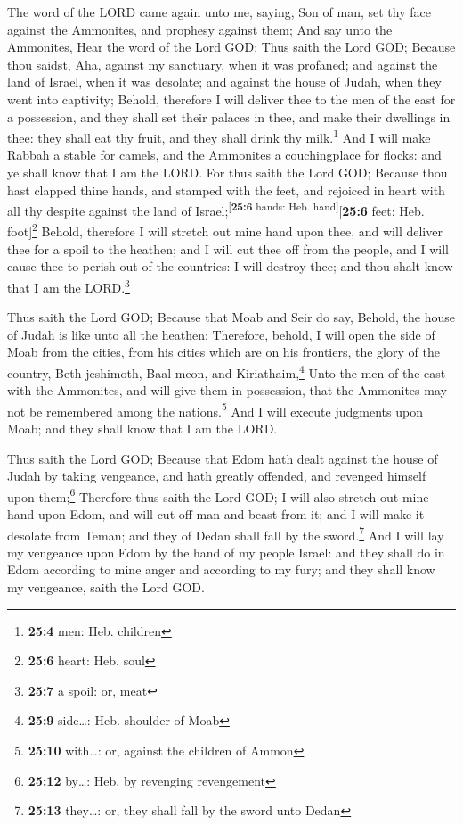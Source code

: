  The word of the LORD came again unto me, saying,
 Son of man, set thy face against the Ammonites, and
prophesy against them;  And say unto the Ammonites, Hear
the word of the Lord GOD; Thus saith the Lord GOD; Because thou saidst,
Aha, against my sanctuary, when it was profaned; and against the land of
Israel, when it was desolate; and against the house of Judah, when they
went into captivity;  Behold, therefore I will deliver
thee to the men of the east for a possession, and they shall set their
palaces in thee, and make their dwellings in thee: they shall eat thy
fruit, and they shall drink thy milk.\footnote{\textbf{25:4} men: Heb.
  children}  And I will make Rabbah a stable for camels,
and the Ammonites a couchingplace for flocks: and ye shall know that I
am the LORD.  For thus saith the Lord GOD; Because thou
hast clapped thine hands, and stamped with the feet, and rejoiced in
heart with all thy despite against the land of
Israel;\textsuperscript{{[}\textbf{25:6} hands: Heb.
hand{]}}{[}\textbf{25:6} feet: Heb. foot{]}\footnote{\textbf{25:6}
  heart: Heb. soul}  Behold, therefore I will stretch out
mine hand upon thee, and will deliver thee for a spoil to the heathen;
and I will cut thee off from the people, and I will cause thee to perish
out of the countries: I will destroy thee; and thou shalt know that I am
the LORD.\footnote{\textbf{25:7} a spoil: or, meat}

 Thus saith the Lord GOD; Because that Moab and Seir do
say, Behold, the house of Judah is like unto all the heathen;
 Therefore, behold, I will open the side of Moab from the
cities, from his cities which are on his frontiers, the glory of the
country, Beth-jeshimoth, Baal-meon, and Kiriathaim,\footnote{\textbf{25:9}
  side\ldots: Heb. shoulder of Moab}  Unto the men of the
east with the Ammonites, and will give them in possession, that the
Ammonites may not be remembered among the nations.\footnote{\textbf{25:10}
  with\ldots: or, against the children of Ammon}  And I
will execute judgments upon Moab; and they shall know that I am the
LORD.

 Thus saith the Lord GOD; Because that Edom hath dealt
against the house of Judah by taking vengeance, and hath greatly
offended, and revenged himself upon them;\footnote{\textbf{25:12}
  by\ldots: Heb. by revenging revengement}  Therefore
thus saith the Lord GOD; I will also stretch out mine hand upon Edom,
and will cut off man and beast from it; and I will make it desolate from
Teman; and they of Dedan shall fall by the sword.\footnote{\textbf{25:13}
  they\ldots: or, they shall fall by the sword unto Dedan}
 And I will lay my vengeance upon Edom by the hand of my
people Israel: and they shall do in Edom according to mine anger and
according to my fury; and they shall know my vengeance, saith the Lord
GOD.

